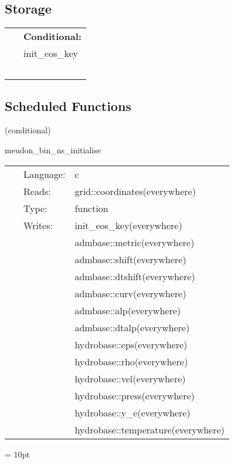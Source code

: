 \subsection*{Storage}

\hspace{5mm}

 \begin{tabular*}{160mm}{ll} 
~& {\bf Conditional:} \\ 
~ &  init\_eos\_key\\ 
~ & ~\\ 
\end{tabular*} 


\subsection*{Scheduled Functions}
\vspace{5mm}

   (conditional) 

\hspace{5mm} meudon\_bin\_ns\_initialise 

\hspace{5mm}{\it set up binary neutron star initial data } 


\hspace{5mm}

 \begin{tabular*}{160mm}{cll} 
~ & Language:  & c \\ 
~ & Reads:  & grid::coordinates(everywhere) \\ 
~ & Type:  & function \\ 
~ & Writes:  & init\_eos\_key(everywhere) \\ 
~& ~ &admbase::metric(everywhere)\\ 
~& ~ &admbase::shift(everywhere)\\ 
~& ~ &admbase::dtshift(everywhere)\\ 
~& ~ &admbase::curv(everywhere)\\ 
~& ~ &admbase::alp(everywhere)\\ 
~& ~ &admbase::dtalp(everywhere)\\ 
~& ~ &hydrobase::eps(everywhere)\\ 
~& ~ &hydrobase::rho(everywhere)\\ 
~& ~ &hydrobase::vel(everywhere)\\ 
~& ~ &hydrobase::press(everywhere)\\ 
~& ~ &hydrobase::y\_e(everywhere)\\ 
~& ~ &hydrobase::temperature(everywhere)\\ 
\end{tabular*} 



\vspace{5mm}\parskip = 10pt 

